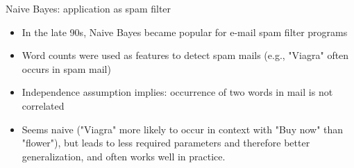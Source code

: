 




\begin{vbframe}{Naive Bayes: application as spam filter}
\begin{itemize}
  \item In the late 90s, Naive Bayes became popular for e-mail spam filter programs
  \item Word counts were used as features to detect spam mails (e.g., "Viagra" often occurs in spam mail)
  \item Independence assumption implies: occurrence of two words in mail is not correlated
  \item Seems naive ("Viagra" more likely to occur in context with "Buy now" than "flower"), but leads to less required parameters and therefore better generalization, and often works well in practice.
\end{itemize}
\end{vbframe}


\endlecture



